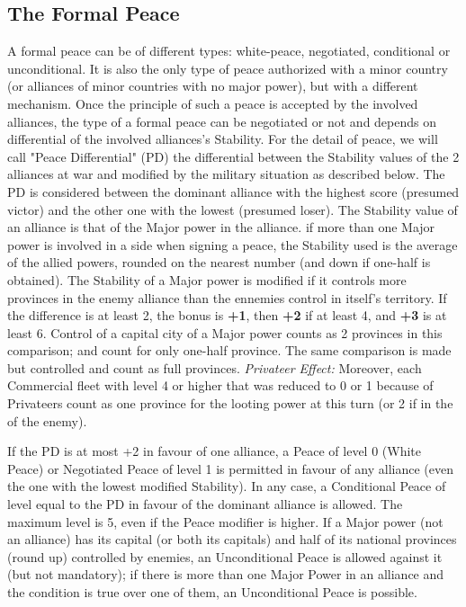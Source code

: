 \subsection{The Formal Peace}

\aparag A formal peace can be of different types: white-peace, negotiated,
conditional or unconditional.
\bparag It is also the only type of peace authorized with a minor country (or
alliances of minor countries with no major power), but with a different
mechanism.
\bparag Once the principle of such a peace is accepted by the involved
alliances, the type of a formal peace can be negotiated or not and depends on
differential of the involved alliances's Stability.
For the detail of peace, we will call "Peace Differential" (PD) the
differential between the Stability values of the 2 alliances at war and
modified by the military situation as described below.  The PD is considered
between the dominant alliance with the highest score (presumed victor) and the
other one with the lowest (presumed loser). The Stability value of an alliance
is that of the Major power in the alliance.
if more than one Major power is involved in a side when signing a peace, the
Stability used is the average of the allied powers, rounded on the nearest
number (and down if one-half is obtained).
The Stability of a Major power is modified if it controls more provinces in
the enemy alliance than the ennemies control in itself's territory.  If the
difference is at least 2, the bonus is {\bf +1}, then {\bf +2} if at least 4,
and {\bf +3} is at least 6. Control of a capital city of a Major power counts
as 2 provinces in this comparison; \COL and \TP count for only one-half
province.
The same comparison is made but controlled \COL and \TP count as full
provinces.  \textit{Privateer Effect:} Moreover, each Commercial fleet with
level 4 or higher that was reduced to 0 or 1 because of Privateers count as
one province for the looting power at this turn (or 2 if in the \CTZ of the
enemy).

\bparag If the PD is at most +2 in favour of one alliance, a Peace of level 0
(White Peace) or Negotiated Peace of level 1 is permitted in favour of any
alliance (even the one with the lowest modified Stability).
\bparag In any case, a Conditional Peace of level equal to the PD in favour of
the dominant alliance is allowed. The maximum level is 5, even if the Peace
modifier is higher.
\bparag If a Major power (not an alliance) has its capital (or both its
capitals) and half of its national provinces (round up) controlled by enemies,
an Unconditional Peace is allowed against it (but not mandatory); if there is
more than one Major Power in an alliance and the condition is true over one of
them, an Unconditional Peace is possible.

